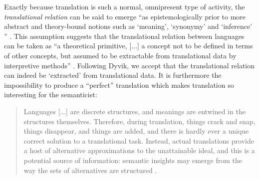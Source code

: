 Exactly because translation is such a normal, omnipresent type of activity, the \textit{translational} \textit{relation} can be said to emerge “as epistemologically prior to more abstract and theory-bound notions such as ‘meaning’, ‘synonymy’ and ‘inference’ ” \citep[27]{langemets_translations_2005}. This assumption suggests that the translational relation between languages can be taken as “a theoretical primitive, [...] a concept not to be defined in terms of other concepts, but assumed to be extractable from translational data by interpretive methods” \citep[27]{langemets_translations_2005}. Following Dyvik, we accept that the translational relation can indeed be ‘extracted’ from translational data. It is furthermore the impossibility to produce a “perfect” translation which makes translation so interesting for the semanticist:

\begin{quote}
Languages [...] are discrete structures, and meanings are entwined in the structures themselves. Therefore, during translation, things crack and snap, things disappear, and things are added, and there is hardly ever a unique correct solution to a translational task. Instead, actual translations provide a host of alternative approximations to the unattainable ideal, and this is a potential source of information: semantic insights may emerge from the way the sets of alternatives are structured \citep[28]{langemets_translations_2005}.
\end{quote}


